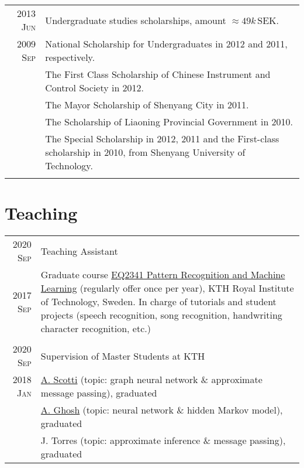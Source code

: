 \documentclass[a4paper,10pt]{article}
\begin{document}
\begin{savenotes}
\begin{longtable}{r|p{13cm}}
    \textsc{2013 Jun}	& Undergraduate studies scholarships, amount $\approx 49k\,\mathrm {SEK}$.\\
    \textsc{2009 Sep}
                      & National Scholarship for Undergraduates in 2012 and 2011, respectively.\\
                      & The First Class Scholarship of Chinese Instrument and Control Society in 2012.\\
                      & The Mayor Scholarship of Shenyang City in 2011.\\
                      & The Scholarship of Liaoning Provincial Government in 2010.\\
                      & The Special Scholarship in 2012, 2011 and the First-class scholarship in 2010, from Shenyang University of Technology.\\
    \multicolumn{2}{c}{} \\

  \end{longtable}
\end{savenotes}


\section{Teaching}
\begin{tabular}{r|p{13cm}}
  \textsc{2020 Sep}  & Teaching Assistant \\
  \textsc{2017 Sep}  & Graduate course \href{https://www.kth.se/student/kurser/kurs/EQ2341?l=en}{EQ2341 Pattern Recognition and Machine Learning} (regularly offer once per year), KTH Royal Institute of Technology, Sweden. In charge of tutorials and student projects (speech recognition, song recognition, handwriting character recognition, etc.)\\
  \multicolumn{2}{c}{} \\

  \textsc{2020 Sep}  & Supervision of Master Students at KTH \\
  \textsc{2018 Jan}  & \href{https://www.linkedin.com/in/andrea-scotti-144955184/}{A. Scotti} (topic: graph neural network \& approximate message passing), graduated \\
                      & \href{https://www.linkedin.com/in/anubhabghosh/}{A. Ghosh} (topic: neural network \& hidden Markov model), graduated \\
                      & J. Torres (topic: approximate inference \& message passing), graduated
\end{tabular}
\end{document}
